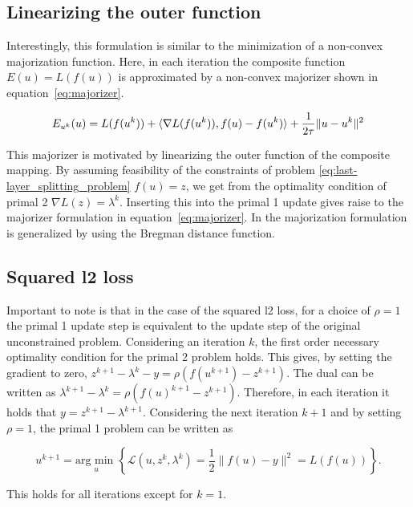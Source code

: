 \documentclass[english,11pt,a4paper]{article}
\begin{document}
\subsection{Linearizing the outer function}

Interestingly, this formulation is similar to the minimization of a non-convex majorization function. Here, in each iteration the composite function $E(u) = L(f(u))$ is approximated by a non-convex majorizer shown in equation~\ref{eq:majorizer}.

\begin{equation}
	E_{u^k}(u) = L(f(u^k))
	+ \langle \nabla L(f(u^k)), f(u)-f(u^k) \rangle
	+ \frac{1}{2 \tau} \|u - u^k \|^2
	\label{eq:majorizer}
\end{equation}

This majorizer is motivated by linearizing the outer function of the composite mapping. By assuming feasibility of the constraints of problem \ref{eq:last-layer_splitting_problem} $f(u) = z$, we get from the optimality condition of primal 2 $\nabla L(z) = \lambda^k$. Inserting this into the primal 1 update gives raise to the majorizer formulation in equation~\ref{eq:majorizer}. In \cite{geiping2018composite} the majorization formulation is generalized by using the Bregman distance function.

\subsection{Squared l2 loss}

Important to note is that in the case of the squared l2 loss, for a choice of $\rho=1$ the primal 1 update step is equivalent to the update step of the original unconstrained problem. Considering an iteration $k$, the first order necessary optimality condition for the primal 2 problem holds. This gives, by setting the gradient to zero, $z^{k+1} - \lambda^k - y = \rho(f(u^{k+1}) - z^{k+1})$. The dual can be written as $\lambda^{k+1} - \lambda^k = \rho(f(u)^{k+1} - z^{k+1})$. Therefore, in each iteration it holds that $y = z^{k+1} - \lambda^{k+1}$. Considering the next iteration $k+1$ and by setting $\rho=1$, the primal 1 problem can be written as 

\begin{equation}
	u^{k+1} = \underset{u}{\text{arg min }} \left\{ \mathcal{L}(u, z^k, \lambda^k)
	= \frac{1}{2} \|f(u) - y\|^2 = L(f(u)) \right\}.
\end{equation}

This holds for all iterations except for $k=1$.
\end{document}
